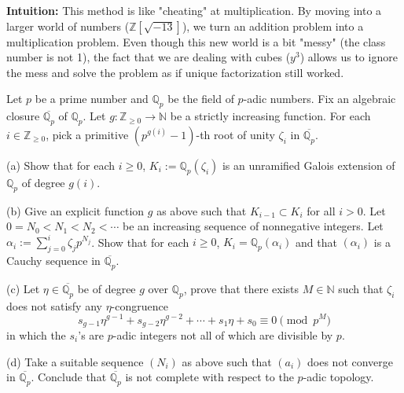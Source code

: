 \begin{solution}
\textbf{Intuition:}
This method is like "cheating" at multiplication. By moving into a larger world of numbers ($\mathbb{Z}[\sqrt{-13}]$), we turn an addition problem into a multiplication problem. Even though this new world is a bit "messy" (the class number is not 1), the fact that we are dealing with cubes ($y^3$) allows us to ignore the mess and solve the problem as if unique factorization still worked.
\end{solution}

\begin{exercise}
\label{algebra:2021:6}
Let $p$ be a prime number and $\mathbb{Q}_p$ be the field of $p$-adic numbers. Fix an algebraic closure $\overline{\mathbb{Q}_p}$ of $\mathbb{Q}_p$. Let $g: \mathbb{Z}_{\geq 0} \to \mathbb{N}$ be a strictly increasing function. For each $i \in \mathbb{Z}_{\geq 0}$, pick a primitive $(p^{g(i)} - 1)$-th root of unity $\zeta_i$ in $\overline{\mathbb{Q}_p}$.

(a) Show that for each $i \geq 0$, $K_i := \mathbb{Q}_p(\zeta_i)$ is an unramified Galois extension of $\mathbb{Q}_p$ of degree $g(i)$.

(b) Give an explicit function $g$ as above such that $K_{i-1} \subset K_i$ for all $i > 0$. Let $0 = N_0 < N_1 < N_2 < \cdots$ be an increasing sequence of nonnegative integers. Let $\alpha_i := \sum_{j=0}^i \zeta_j p^{N_j}$. Show that for each $i \geq 0$, $K_i = \mathbb{Q}_p(\alpha_i)$ and that $(\alpha_i)$ is a Cauchy sequence in $\overline{\mathbb{Q}_p}$.

(c) Let $\eta \in \overline{\mathbb{Q}_p}$ be of degree $g$ over $\mathbb{Q}_p$, prove that there exists $M \in \mathbb{N}$ such that $\zeta_i$ does not satisfy any $\eta$-congruence
$$s_{g-1}\eta^{g-1} + s_{g-2}\eta^{g-2} + \cdots + s_1\eta + s_0 \equiv 0 \pmod{p^M}$$
in which the $s_i$'s are $p$-adic integers not all of which are divisible by $p$.

(d) Take a suitable sequence $(N_i)$ as above such that $(a_i)$ does not converge in $\overline{\mathbb{Q}_p}$. Conclude that $\overline{\mathbb{Q}_p}$ is not complete with respect to the $p$-adic topology.
\end{exercise}

